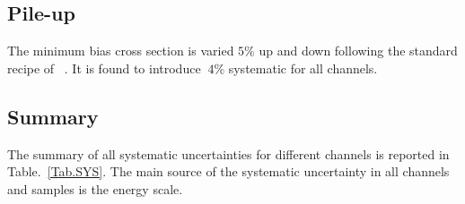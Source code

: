 \subsection{Pile-up}

The minimum bias cross section is varied $5 \%$ up and down following the standard recipe of ~\cite{PU_SYS}. It is found to introduce $~4 \%$ systematic for all channels.    
\\

\subsection{Summary}
The summary of all systematic uncertainties for different channels is reported in Table.~\ref{Tab.SYS}. The main source of the systematic uncertainty in all channels and samples is the \hadtau energy scale.



